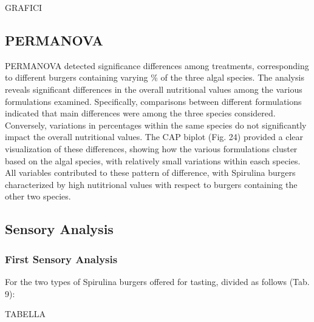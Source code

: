 GRAFICI

\subsection{PERMANOVA}
PERMANOVA detected significance differences among treatments, corresponding to different burgers containing varying \% of the three algal species. The analysis reveals significant differences in the overall nutritional values among the various formulations examined. Specifically, comparisons between different formulations indicated that main differences were among the three species considered. Conversely, variations in percentages within the same species do not significantly impact the overall nutritional values.
The CAP biplot (Fig. 24) provided a clear visualization of these differences, showing how the various formulations cluster based on the algal species, with relatively small variations within easch species. All variables contributed to these pattern of difference, with Spirulina burgers characterized by high nutitrional values with respect to burgers containing the other two species.

\subsection{Sensory Analysis}
\subsubsection{First Sensory Analysis}
For the two types of Spirulina burgers offered for tasting, divided as follows (Tab. 9):

TABELLA

